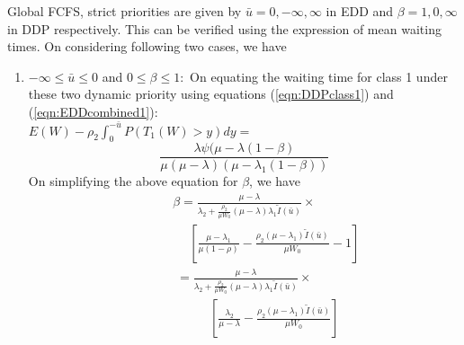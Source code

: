 \documentclass[letterpaper, 10 pt, conference]{ieeeconf}  %
\newenvironment{mylemma}[1]{{ \textbf{\textit{Proof of Lemma #1:}}}}{}
\begin{document}
\begin{appendices}
\begin{mylemma}{\ref{clm:equivalenceDDPnEDD}}
Global FCFS, strict priorities are given by $\bar{u} = 0, -\infty, \infty$ in EDD and $\beta = 1, 0, \infty$ in DDP respectively. This can be verified using the expression of mean waiting times. On considering following two cases, we have
\begin{enumerate}
\item $-\infty \le \bar{u} \le 0$ and $0 \le \beta \le 1:$ On equating the waiting time for class 1 under these two dynamic priority using equations (\ref{eqn:DDPclass1}) and (\ref{eqn:EDDcombined1}):\\ $E(W) - \rho_2\int_0^{-\bar{u}}P(T_1(W)> y)dy =$
\begin{equation}
 \frac{\lambda \psi(\mu - \lambda(1-\beta)}{\mu(\mu -\lambda)(\mu - \lambda_1(1-\beta))}
\end{equation}  
On simplifying the above equation for $\beta$, we have 
\begin{eqnarray}\nonumber
 \beta = \frac{\mu-\lambda}{\lambda_2+\frac{\rho_2}{\mu W_0}(\mu-\lambda)\lambda_1 \tilde{I}(\bar{u})}\times
\end{eqnarray}
\begin{eqnarray}\nonumber
\hspace{2cm}\left[\frac{\mu-\lambda_1}{\mu(1 - \rho)} - \frac{\rho_2(\mu-\lambda_1)\tilde{I}(\bar{u})}{\mu W_0} - 1\right]
\end{eqnarray}
\begin{eqnarray}\nonumber
  = \frac{\mu-\lambda}{\lambda_2+\frac{\rho_2}{\mu W_0}(\mu-\lambda)\lambda_1 \tilde{I}(\bar{u})} \times
\end{eqnarray}
\begin{eqnarray}\label{eqn:relbetau1}
\hspace{2cm}\left[\frac{\lambda_2}{\mu - \lambda} - \frac{\rho_2(\mu-\lambda_1)\tilde{I}(\bar{u})}{\mu W_0} \right]
\end{eqnarray}


\end{enumerate}
\end{mylemma}
\end{appendices}
\end{document}
